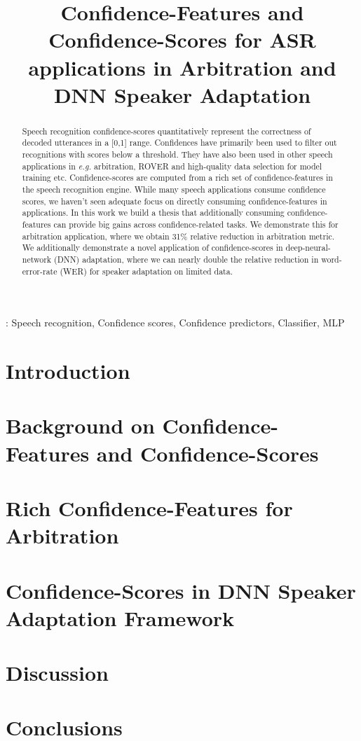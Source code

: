 \documentclass[a4paper]{article}
\title{Confidence-Features and Confidence-Scores for ASR applications in Arbitration and DNN Speaker Adaptation}
\begin{document}
\maketitle

\begin{abstract}
Speech recognition confidence-scores quantitatively represent the correctness of
decoded utterances in a [0,1] range. Confidences have primarily been used to filter out recognitions with scores below a threshold. They have also been used in other speech applications in \emph{e.g.} arbitration, ROVER and high-quality data selection for model training etc. Confidence-scores are computed from a rich set of confidence-features in the speech recognition engine. While many speech applications consume confidence scores, we haven't seen adequate focus on directly consuming confidence-features in applications. In this work we build a thesis that additionally consuming confidence-features can provide big gains across confidence-related tasks. We demonstrate this for arbitration application, where we obtain 31\% relative reduction in arbitration metric. We additionally demonstrate a novel application of confidence-scores in deep-neural-network (DNN) adaptation, where we can nearly double the relative reduction in word-error-rate (WER) for speaker adaptation on limited data.
\end{abstract}
: Speech recognition, Confidence scores, Confidence predictors, Classifier, MLP

%
\section{Introduction}\label{Sec:Intro}


\section{Background on Confidence-Features and Confidence-Scores}\label{Sec:CC-Background}



\section{Rich Confidence-Features for Arbitration}\label{Sec:Arbitration}


\section{Confidence-Scores in DNN Speaker Adaptation Framework}\label{Sec:Adaptation}


\section{Discussion}\label{Sec:Discussion}


\section{Conclusions}\label{Sec:Conclusion}


%


\end{document}
